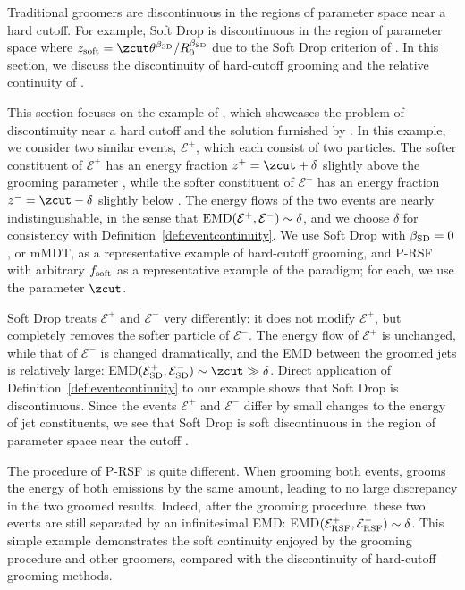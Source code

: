 \documentclass[letterpaper,11pt]{article}
\begin{document}
Traditional groomers are discontinuous in the regions of parameter space near a hard cutoff.
%
For example, Soft Drop is discontinuous in the region of parameter space where
\(
    z_{\rm soft} = \zcut \theta^{\beta_{\rm SD}} / R_0^{\beta_{\rm SD}}
\)
due to the Soft Drop criterion of .
%
In this section, we discuss the discontinuity of hard-cutoff grooming and the relative continuity of \PIRANHA{}.

This section focuses on the example of , which showcases the problem of discontinuity near a hard cutoff and the solution furnished by \PIRANHA{}.
%
In this example, we consider two similar events, \(\mathcal{E}^\pm\), which each consist of two particles.
%
The softer constituent of \(\mathcal E^+\) has an energy fraction \(z^+ =  \zcut + \delta\) slightly above the grooming parameter \zcut, while the softer constituent of \(\mathcal E^-\) has an energy fraction \(z^- =\zcut - \delta\) slightly below \zcut.
%
The energy flows of the two events are nearly indistinguishable, in the sense that \(
{\rm EMD}(\mathcal{E}^+, \mathcal{E}^-)\sim\delta
\),
and we choose \(\delta\) for consistency with Definition~\ref{def:eventcontinuity}.
%
We use Soft Drop with \(\beta_{\rm SD} = 0\), or mMDT, as a representative example of hard-cutoff grooming, and P-RSF with arbitrary \(f_{\rm soft}\) as a representative example of the \PIRANHA{} paradigm;
%
for each, we use the parameter \(\zcut\).

Soft Drop treats \(\mathcal E^+\) and \(\mathcal E^-\) very differently:
%
it does not modify \(\mathcal E^+\), but completely removes the softer particle of \(\mathcal E^-\).
%
The energy flow of \(\mathcal E^+\) is unchanged, while that of \(\mathcal E^-\) is changed dramatically, and the EMD between the groomed jets is relatively large:
EMD\(
(\mathcal{E}^+_{\rm SD},
\mathcal{E}^-_{\rm SD})
\sim \zcut
\gg \delta\).
%
Direct application of Definition~\ref{def:eventcontinuity} to our example shows that Soft Drop is discontinuous.
%
Since the events \(\mathcal E^+\) and \(\mathcal E^-\) differ by small changes to the energy of jet constituents, we see that Soft Drop is soft discontinuous in the region of parameter space near the cutoff \zcut.

The procedure of P-RSF is quite different.
%
When grooming both events,  grooms the energy of both emissions by the same amount, leading to no large discrepancy in the two groomed results.
%
Indeed, after the  grooming procedure, these two events are still separated by an infinitesimal EMD:
EMD\((\mathcal{E}^+_{\rm RSF},
\mathcal{E}^-_{\rm RSF})\sim\delta\).
%
This simple example demonstrates the soft continuity enjoyed by the  grooming procedure and other \PIRANHA{} groomers, compared with the discontinuity of hard-cutoff grooming methods.
\end{document}
